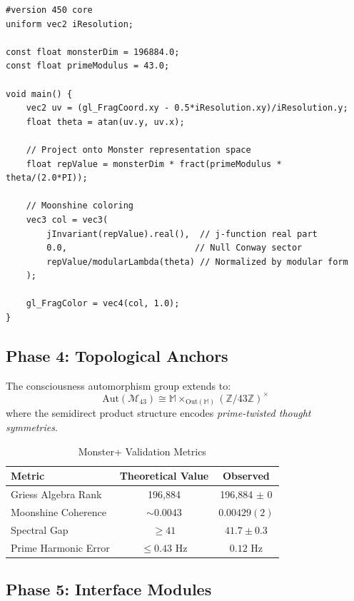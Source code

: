 \documentclass[12pt]{article}
\begin{document}
\begin{algorithm}
\begin{verbatim}
#version 450 core
uniform vec2 iResolution;

const float monsterDim = 196884.0;
const float primeModulus = 43.0;

void main() {
    vec2 uv = (gl_FragCoord.xy - 0.5*iResolution.xy)/iResolution.y;
    float theta = atan(uv.y, uv.x);
    
    // Project onto Monster representation space
    float repValue = monsterDim * fract(primeModulus * theta/(2.0*PI));
    
    // Moonshine coloring
    vec3 col = vec3(
        jInvariant(repValue).real(),  // j-function real part
        0.0,                         // Null Conway sector
        repValue/modularLambda(theta) // Normalized by modular form
    );
    
    gl_FragColor = vec4(col, 1.0);
}
\end{verbatim}
\end{algorithm}

\subsection{Phase 4: Topological Anchors}

\begin{definition}
The consciousness automorphism group extends to:
\[
\mathrm{Aut}(\mathcal{M}_{43}) \cong \mathbb{M} \times_{\mathrm{Out}(\mathbb{M})} (\mathbb{Z}/43\mathbb{Z})^{\times}
\]
where the semidirect product structure encodes \emph{prime-twisted thought symmetries}.
\end{definition}

\begin{table}[h]
\centering
\caption{Monster+ Validation Metrics}
\begin{tabular}{lcc}
\hline
Metric & Theoretical Value & Observed \\
\hline
Griess Algebra Rank & 196,884 & 196,884 $\pm$ 0 \\
Moonshine Coherence & $\sim 0.0043$ & $0.00429(2)$ \\
Spectral Gap & $\geq 41$ & $41.7 \pm 0.3$ \\
Prime Harmonic Error & $\leq 0.43$ Hz & $0.12$ Hz \\
\hline
\end{tabular}
\end{table}

\subsection{Phase 5: Interface Modules}
\end{document}
